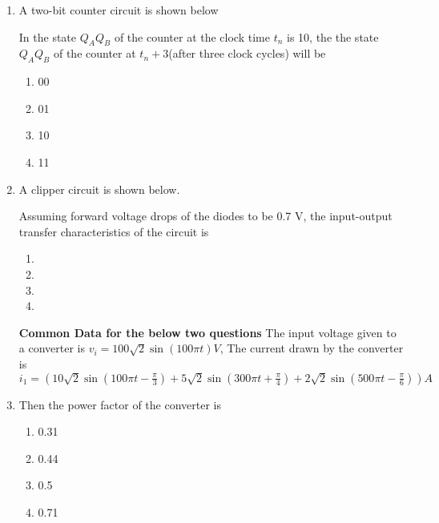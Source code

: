 \documentclass[journal]{IEEEtran}
\begin{document}
\begin{enumerate}
    \item A two-bit counter circuit is shown below
    
    In the state $Q_A Q_B$ of the counter at the clock time $t_n$ is 10, the the state $Q_A Q_B$ of the counter at $t_n +3$(after three clock cycles)  will be 
    
            \begin{enumerate}
             \item 00
\item 01
\item 10
\item 11 
              \end{enumerate}
        

    \item A clipper circuit is shown below.
    
    Assuming forward voltage drops of the diodes to be 0.7 V, the input-output transfer characteristics of the circuit is

 \begin{enumerate}
 \newpage
\item 
\newpage
\item 
\newpage
\item 

\item 
            \end{enumerate}
        

\textbf{Common Data for the below two questions }
The input voltage given to a converter is $v_i=100\sqrt{2} \sin(100\pi t)V$, The current drawn by the converter is $i_1=(10\sqrt{2} \sin (100\pi t-\frac{\pi}{3})+5\sqrt{2} \sin (300\pi t+\frac{\pi}{4})+2\sqrt{2}\sin (500\pi t-\frac{\pi}{6}))A$
    \item Then the power factor  of the converter is 
    \begin{multicols}{4}
            \begin{enumerate}
        \item 0.31
\item 0.44
\item  0.5
\item 0.71
            \end{enumerate}
        \end{multicols}
 


\end{enumerate}
\end{document}
